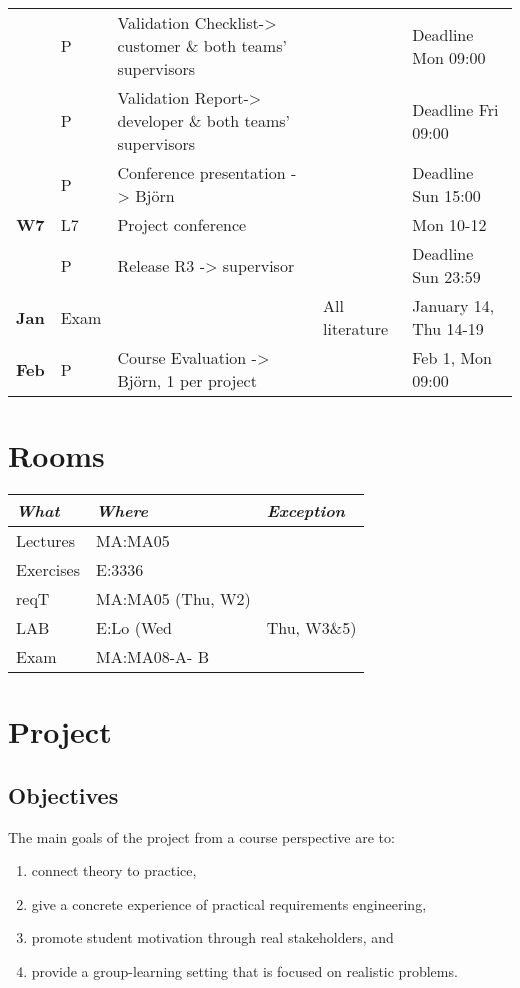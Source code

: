 \documentclass[10pt,a4paper]{article}
\begin{document}
\begin{flushleft}
\begin{tabular}{c | p{0.5cm} p{4.4cm} p{2.2cm}  p{3.2cm}}
 & P &  \multirow{1}{*}{\footnotesize Validation Checklist-> customer \& both teams' supervisors} & & Deadline Mon  09:00  \\ & P &  \multirow{1}{*}{\footnotesize Validation Report-> developer \& both teams' supervisors} & & Deadline Fri  09:00  \\
 & P & Conference presentation -> Björn& & Deadline Sun  15:00  \\
\hline
\multirow{1}{*}{{\bfseries\sffamily W7}} 
 & L7 & Project conference &  & Mon 10-12\\
 & P & Release R3 -> supervisor & & Deadline Sun 23:59\\
  \hline
\multirow{1}{*}{{\bfseries\sffamily Jan }} 
  & Exam & &All literature  & January 14, Thu 14-19 \\
\multirow{1}{*}{{\bfseries\sffamily Feb }}   
  &  P & \multirow{1}{*}{Course Evaluation -> Björn, 1 per project} & & Feb 1, Mon 09:00\\

\hline
\end{tabular} 
\end{flushleft}

\section{Rooms}
\begin{flushleft}
\small
\begin{tabular}{l | l | l} 
{\it What} & {\it Where} & {\it Exception} \\
\hline
Lectures & MA:MA05  \\
Exercises & E:3336  \\
reqT & MA:MA05 (Thu, W2)   \\
LAB & E:Lo (Wed & Thu, W3\&5)\\
Exam & MA:MA08-A- B \\
\end{tabular}
\end{flushleft}
\newpage
\section{Project}
\subsection{Objectives}
The main goals of the project from a course perspective are to:
\begin{enumerate}[noitemsep]
\item connect theory to practice,
\item give a concrete experience of practical requirements engineering,
\item promote student motivation through real stakeholders, and
\item provide a group-learning setting that is focused on realistic problems.
\end{enumerate}
\end{document}
